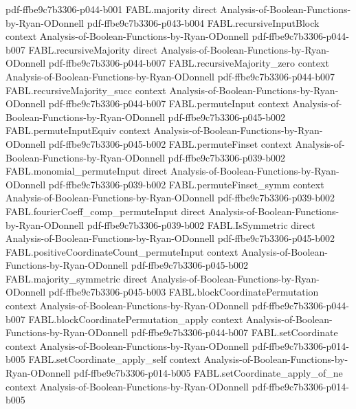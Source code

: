 \begin{theorem}
  {pdf-ffbe9c7b3306-p044-b001}
\proofstep
  {FABL.majority}
  {direct}
  {Analysis-of-Boolean-Functions-by-Ryan-ODonnell}
  {pdf-ffbe9c7b3306-p043-b004}
\proofstep
  {FABL.recursiveInputBlock}
  {context}
  {Analysis-of-Boolean-Functions-by-Ryan-ODonnell}
  {pdf-ffbe9c7b3306-p044-b007}
\proofstep
  {FABL.recursiveMajority}
  {direct}
  {Analysis-of-Boolean-Functions-by-Ryan-ODonnell}
  {pdf-ffbe9c7b3306-p044-b007}
\proofstep
  {FABL.recursiveMajority_zero}
  {context}
  {Analysis-of-Boolean-Functions-by-Ryan-ODonnell}
  {pdf-ffbe9c7b3306-p044-b007}
\proofstep
  {FABL.recursiveMajority_succ}
  {context}
  {Analysis-of-Boolean-Functions-by-Ryan-ODonnell}
  {pdf-ffbe9c7b3306-p044-b007}
\proofstep
  {FABL.permuteInput}
  {context}
  {Analysis-of-Boolean-Functions-by-Ryan-ODonnell}
  {pdf-ffbe9c7b3306-p045-b002}
\proofstep
  {FABL.permuteInputEquiv}
  {context}
  {Analysis-of-Boolean-Functions-by-Ryan-ODonnell}
  {pdf-ffbe9c7b3306-p045-b002}
\proofstep
  {FABL.permuteFinset}
  {context}
  {Analysis-of-Boolean-Functions-by-Ryan-ODonnell}
  {pdf-ffbe9c7b3306-p039-b002}
\proofstep
  {FABL.monomial_permuteInput}
  {direct}
  {Analysis-of-Boolean-Functions-by-Ryan-ODonnell}
  {pdf-ffbe9c7b3306-p039-b002}
\proofstep
  {FABL.permuteFinset_symm}
  {context}
  {Analysis-of-Boolean-Functions-by-Ryan-ODonnell}
  {pdf-ffbe9c7b3306-p039-b002}
\proofstep
  {FABL.fourierCoeff_comp_permuteInput}
  {direct}
  {Analysis-of-Boolean-Functions-by-Ryan-ODonnell}
  {pdf-ffbe9c7b3306-p039-b002}
\proofstep
  {FABL.IsSymmetric}
  {direct}
  {Analysis-of-Boolean-Functions-by-Ryan-ODonnell}
  {pdf-ffbe9c7b3306-p045-b002}
\proofstep
  {FABL.positiveCoordinateCount_permuteInput}
  {context}
  {Analysis-of-Boolean-Functions-by-Ryan-ODonnell}
  {pdf-ffbe9c7b3306-p045-b002}
\proofstep
  {FABL.majority_symmetric}
  {direct}
  {Analysis-of-Boolean-Functions-by-Ryan-ODonnell}
  {pdf-ffbe9c7b3306-p045-b003}
\proofstep
  {FABL.blockCoordinatePermutation}
  {context}
  {Analysis-of-Boolean-Functions-by-Ryan-ODonnell}
  {pdf-ffbe9c7b3306-p044-b007}
\proofstep
  {FABL.blockCoordinatePermutation_apply}
  {context}
  {Analysis-of-Boolean-Functions-by-Ryan-ODonnell}
  {pdf-ffbe9c7b3306-p044-b007}
\proofstep
  {FABL.setCoordinate}
  {context}
  {Analysis-of-Boolean-Functions-by-Ryan-ODonnell}
  {pdf-ffbe9c7b3306-p014-b005}
\proofstep
  {FABL.setCoordinate_apply_self}
  {context}
  {Analysis-of-Boolean-Functions-by-Ryan-ODonnell}
  {pdf-ffbe9c7b3306-p014-b005}
\proofstep
  {FABL.setCoordinate_apply_of_ne}
  {context}
  {Analysis-of-Boolean-Functions-by-Ryan-ODonnell}
  {pdf-ffbe9c7b3306-p014-b005}
\proofstep

\end{theorem}
